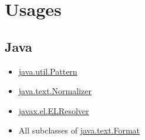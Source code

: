 
\section {Usages}

\subsection{Java}

\begin{itemize}
    \item \href{http://docs.oracle.com/javase/8/docs/api/java/util/regex/Pattern.html}{java.util.Pattern} 
    \item \href{http://docs.oracle.com/javase/8/docs/api/java/text/Normalizer.html}{java.text.Normalizer} 
    \item \href{http://docs.oracle.com/javaee/7/api/javax/el/ELResolver.html}{javax.el.ELResolver} 
    \item All subclasses of \href{http://docs.oracle.com/javase/8/docs/api/java/text/Format.html}{java.text.Format}
\end{itemize}
